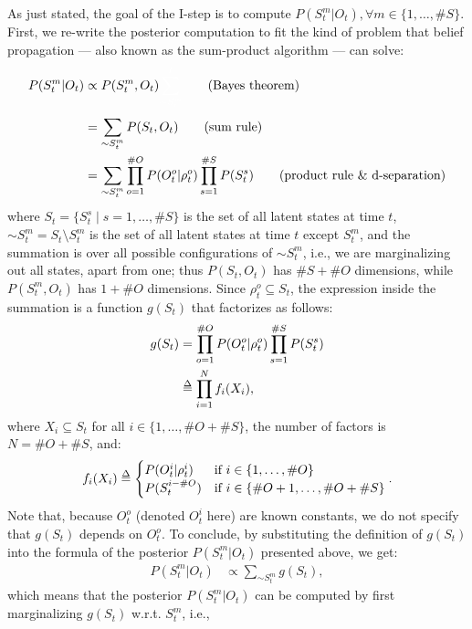 \documentclass[twoside,11pt]{article}
\def\delequal{\mathrel{\ensurestackMath{\stackon[1pt]{=}{\scriptstyle\Delta}}}}
\newcommand{\nb}[1]{\# #1}
\begin{document}
As just stated, the goal of the I-step is to compute $P(S_t^m|O_t), \forall m \in \{1, \hdots, \nb{S}\}$. First, we re-write the posterior computation to fit the kind of problem that belief propagation --- also known as the sum-product algorithm --- can solve:
\begin{align*}
P(S_t^m|O_t) &\propto P(S^m_t, O_t){\color{white}\sum_{\sim S^m_t}^T} \tag{Bayes theorem}\\
&= \sum_{\sim S^m_t}^{{\color{white}}} P(S_t, O_t) \tag{sum rule}\\
&= \sum_{\sim S^m_t} \prod_{o=1}^{\nb{O}} P(O_t^o|\rho_t^o)\prod_{s=1}^{\nb{S}} P(S_t^s) \tag{product rule \& d-separation}\\
\end{align*}
where $S_t = \{S_t^s \mid s = 1, \hdots, \nb{S}\}$ is the set of all latent states at time $t$, ${\sim}S_t^m = S_t \setminus S_t^m$ is the set of all latent states at time $t$ except $S^m_t$, and the summation is over all possible configurations of ${\sim}S_t^m$, i.e., we are marginalizing out all states, apart from one; thus $P(S_t, O_t)$ has $\nb{S} + \nb{O}$ dimensions, while $P(S^m_t, O_t)$  has $1 + \nb{O}$ dimensions. Since $\rho_t^o \subseteq S_t$, the expression inside the summation is a function $g(S_t)$ that factorizes as follows:
\begin{align*}
g(S_t) &= \prod_{o=1}^{\nb{O}} P(O_t^o|\rho_t^o) \prod_{s=1}^{\nb{S}} P(S_t^s)\\
&\delequal \prod_{i=1}^{N} f_i(X_i),
\end{align*}
where $X_i \subseteq S_t$ for all $i \in \{1, \hdots, \nb{O} + \nb{S}\}$, the number of factors is $N = \nb{O}+\nb{S}$, and:
\begin{align*}
f_i(X_i) \delequal \begin{cases}
	P(O_t^i|\rho_t^i) & \text{if } i \in \{1, \hdots, \nb{O}\}\\
	P(S_t^{i - \nb{O}}) & \text{if } i \in \{\nb{O} + 1, \hdots, \nb{O}+\nb{S}\}\\
\end{cases}.
\end{align*}
Note that, because $O_t^o$ (denoted $O_t^i$ here) are known constants, we do not specify that $g(S_t)$ depends on $O_t^o$. To conclude, by substituting the definition of $g(S_t)$ into the formula of the posterior $P(S_t^m|O_t)$ presented above, we get:
\begin{align*}
P(S_t^m|O_t) &\propto \sum_{\sim S^m_t} g(S_t),
\end{align*}
which means that the posterior $P(S_t^m|O_t)$ can be computed by first marginalizing $g(S_t)$ w.r.t. $S_t^m$, i.e.,
\end{document}
